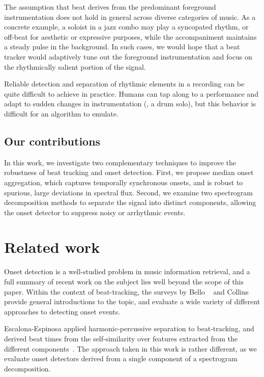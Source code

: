 \documentclass{article}
\begin{document}
The assumption that beat derives from the predominant foreground instrumentation does not 
hold in general across diverse categories of music. As a concrete example, a soloist in a 
jazz combo may play a syncopated rhythm, or off-beat for aesthetic or expressive purposes, 
while the accompaniment maintains a steady pulse in the background.  
In such cases, we would hope that a beat tracker would adaptively tune out the foreground 
instrumentation and focus on the rhythmically salient portion of the signal.

Reliable detection and separation of rhythmic elements in a recording can be quite
difficult to achieve in practice.  Humans can tap along to a
performance and adapt to sudden changes in instrumentation (\eg, a drum solo), but 
this behavior is difficult for an algorithm to emulate.

\subsection{Our contributions}
In this work, we investigate two complementary techniques to improve the robustness of 
beat tracking and onset detection. 
First, we propose median onset aggregation, which captures temporally synchronous onsets, and is robust to spurious, large deviations in spectral flux.
Second, we examine two spectrogram decomposition methods to separate the signal into distinct components, allowing the onset detector to suppress noisy or arrhythmic events. 

\section{Related work}
\label{sec:related}
Onset detection is a well-studied problem in music information retrieval, and a full
summary of recent work on the subject lies well beyond the scope of this paper.
Within the context of beat-tracking, the surveys by Bello \etal~\cite{bello2005tutorial}
and Collins~\cite{collins2005comparison} provide general introductions to the topic, and
evaluate a wide variety of different approaches to detecting onset events.  

Escalona-Espinosa applied harmonic-percussive separation to beat-tracking, and derived beat 
times from the self-similarity over features extracted from the different 
components~\cite{escalona2008downbeat}.  The approach taken in this work is rather
different, as we evaluate onset detectors derived from a single component of a
spectrogram decomposition.
\end{document}
